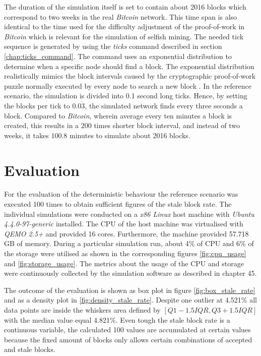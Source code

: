 The duration of the simulation itself is set to contain about 2016 blocks which correspond to two weeks in the real \textit{Bitcoin} network.
This time span is also identical to the time used for the difficulty adjustment of the proof-of-work in \textit{Bitcoin} which is relevant for the simulation of selfish mining. 
The needed tick sequence is generated by using the \textit{ticks} command described in section \ref{chap:ticks_command}.
The command uses an exponential distribution to determine when a specific node should find a block. 
The exponential distribution realistically mimics the block intervals caused by the cryptographic proof-of-work puzzle normally executed by every node to search a new block \cite{nakamoto2008bitcoin, decker2013information, eyal2014majority}.
In the reference scenario, the simulation is divided into 0.1 second long ticks.
Hence, by setting the blocks per tick to $0.0\dot{3}$, the simulated network finds every three seconds a block.
Compared to \textit{Bitcoin}, wherein average every ten minutes a block is created, this results in a 200 times shorter block interval, and instead of two weeks, it takes 100.8 minutes to simulate about 2016 blocks.

\section{Evaluation}

For the evaluation of the deterministic behaviour the reference scenario was executed 100 times to obtain sufficient figures of the stale block rate.
The individual simulations were conducted on a \textit{x86 Linux} host machine with \textit{Ubuntu 4.4.0-97-generic} installed.
The CPU of the host machine was virtualised with \textit{QEMO 2.5+} and provided 16 cores.
Furthermore, the machine provided 57.718 GB of memory.
During a particular simulation run, about 4\% of CPU and 6\% of the storage were utilised as shown in the corresponding figures \ref{fig:cpu_usage} and \ref{fig:storage_usage}.
The metrics about the usage of the CPU and storage were continuously collected by the simulation software as described in chapter 45.

The outcome of the evaluation is shown as box plot in figure \ref{fig:box_stale_rate} and as a density plot in \ref{fig:density_stale_rate}.
Despite one outlier at 4.521\% all data points are inside the whiskers area defined by $[Q1 - 1.5IQR, Q3 + 1.5IQR]$ with the median value equal 4.821\%.
Even tough the stale block rate is a continuous variable, the calculated 100 values are accumulated at certain values because the fixed amount of blocks only allows certain combinations of accepted and stale blocks.

